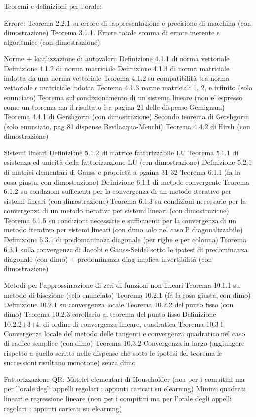 Teoremi e definizioni per l'orale:

Errore:
Teorema 2.2.1 su errore di rappresentazione e precisione di macchina (con dimostrazione)
Teorema 3.1.1. Errore totale somma di errore inerente e algoritmico (con dimostrazione)

Norme + localizzazione di autovalori:
Definizione 4.1.1 di norma vettoriale
Definizione 4.1.2 di norma matriciale
Definizione 4.1.3 di norma matriciale indotta da una norma vettoriale
Teorema 4.1.2 su compatibilità tra norma vettoriale e matriciale indotta 
Teorema 4.1.3 norme matriciali 1, 2, e infinito (solo enunciato)
Teorema sul condizionamento di un sistema lineare (non e' espresso come un teorema ma il risultato è a pagina 21 delle dispense Gemignani)
Teorema 4.4.1 di Gershgorin (con dimostrazione)
Secondo teorema di Gershgorin (solo enunciato, pag 81 dispense Bevilacqua-Menchi) 
Teorema 4.4.2 di Hirsh (con dimostrazione)

Sistemi lineari
Definizione 5.1.2 di matrice fattorizzabile LU
Teorema 5.1.1 di esistenza ed unicità della fattorizzazione LU (con dimostrazione)
Definizione 5.2.1 di matrici elementari di Gauss e proprietà a pgaina 31-32
Teorema 6.1.1 (fa la cosa giusta, con dimostrazione)
Definizione 6.1.1 di metodo convergente
Teorema 6.1.2 su condizioni sufficienti per la convergenza di un metodo iterativo per sistemi lineari (con dimostrazione)
Teorema 6.1.3 su condizioni necessarie per la convergenza di un metodo iterativo per sistemi lineari (con dimostrazione)
Teorema 6.1.5 su condizioni necessarie e sufficinenti per la convergenza di un metodo iterativo per sistemi lineari (con dimo solo nel caso P diagonalizzabile)
Definizione 6.3.1 di predomaninaza diagonale (per righe e per colonna)
Teorema 6.3.1 sulla convergenza di Jacobi e Gauss-Seidel sotto le ipotesi di predominanza diagonale (con dimo) + predominanza diag implica invertibilità (con dimostrazione)

Metodi per l'approssimazione di zeri di funzioni non lineari
Teorema 10.1.1 su metodo di bisezione (solo enunciato)
Teorema 10.2.1 (fa la cosa giusta, con dimo)
Definizione 10.2.1 su convergenza locale
Teorema 10.2.2 del punto fisso (con dimo)
Teorema 10.2.3 corollario al teorema del punto fisso
Definizione 10.2.2+3+4. di ordine di convergenza lineare, quadratica
Teorema 10.3.1 Convergenza locale del metodo delle tangenti e convergenza quadratico nel caso di radice semplice (con dimo)
Teorema 10.3.2 Convergenza in largo (aggiungere rispetto a quello scritto nelle dispense che sotto le ipotesi del teorema le successioni risultano monotone) senza dimo
 
Fattorizzazione QR: Matrici elementari di Householder (non per i compitini ma per l'orale degli appelli regolari : appunti caricati su elearning)
Minimi quadrati lineari e regressione lineare (non per i compitini ma per l'orale degli appelli regolari : appunti caricati su elearning)

